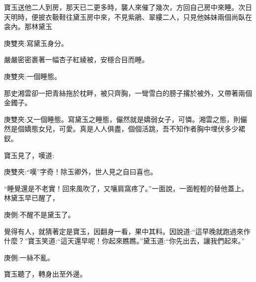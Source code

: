 \begin{parag}
    寶玉送他二人到房，那天已二更多時，襲人來催了幾次，方回自己房中來睡。次日天明時，便披衣靸鞋往黛玉房中來，不見紫鵑、翠縷二人，只見他姊妹兩個尚臥在衾內。那林黛玉\begin{note}庚雙夾:寫黛玉身分。\end{note}嚴嚴密密裹著一幅杏子紅綾被，安穩合目而睡。\begin{note}庚雙夾:一個睡態。\end{note}那史湘雲卻一把青絲拖於枕畔，被只齊胸，一彎雪白的膀子撂於被外，又帶著兩個金鐲子。\begin{note}庚雙夾:又一個睡態。寫黛玉之睡態，儼然就是嬌弱女子，可憐。湘雲之態，則儼然是個嬌態女兒，可愛。真是人人俱盡，個個活跳，吾不知作者胸中埋伏多少裙釵。\end{note}寶玉見了，嘆道:\begin{note}庚雙夾:“嘆”字奇！除玉卿外，世人見之自曰喜也。\end{note}“睡覺還是不老實！回來風吹了，又嚷肩窩疼了。”一面說，一面輕輕的替他蓋上。林黛玉早已醒了，\begin{note}庚側:不醒不是黛玉了。\end{note}覺得有人，就猜著定是寶玉，因翻身一看，果中其料。因說道:“這早晚就跑過來作什麼？”寶玉笑道:“這天還早呢！你起來瞧瞧。”黛玉道:“你先出去，讓我們起來。”\begin{note}庚側:一絲不亂。\end{note}寶玉聽了，轉身出至外邊。
\end{parag}


